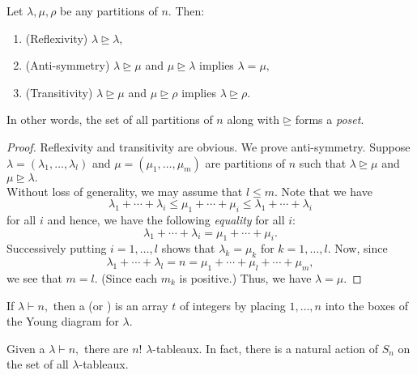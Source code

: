 \begin{prop}
	Let $\lambda, \mu, \rho$ be any partitions of $n.$ Then:
	\begin{enumerate}
		\item (Reflexivity) $\lambda \unrhd \lambda,$
		\item (Anti-symmetry) $\lambda \unrhd \mu$ and $\mu \unrhd \lambda$ implies $\lambda = \mu,$
		\item (Transitivity) $\lambda \unrhd \mu$ and $\mu \unrhd \rho$ implies $\lambda \unrhd \rho.$
	\end{enumerate}
	In other words, the set of all partitions of $n$ along with $\unrhd$ forms a \emph{poset}.
\end{prop}
\begin{proof} 
	Reflexivity and transitivity are obvious. We prove anti-symmetry. Suppose $\lambda = (\lambda_1, \ldots, \lambda_l)$ and $\mu = (\mu_1, \ldots, \mu_m)$ are partitions of $n$ such that $\lambda \unrhd \mu$ and $\mu \unrhd \lambda.$ \\
	Without loss of generality, we may assume that $l \le m.$ Note that we have
	\begin{equation*} 
		\lambda_1 + \cdots + \lambda_i \le \mu_1 + \cdots + \mu_i \le \lambda_1 + \cdots + \lambda_i
	\end{equation*}
	for all $i$ and hence, we have the following \emph{equality} for all $i:$
	\begin{equation*} 
		\lambda_1 + \cdots + \lambda_i = \mu_1 + \cdots + \mu_i.
	\end{equation*}
	Successively putting $i = 1, \ldots, l$ shows that $\lambda_k = \mu_k$ for $k = 1, \ldots, l.$ Now, since
	\begin{equation*} 
		\lambda_1 + \cdots + \lambda_l = n = \mu_1 + \cdots + \mu_l + \cdots + \mu_m,
	\end{equation*}
	we see that $m = l.$ (Since each $m_k$ is positive.) Thus, we have $\lambda = \mu.$
\end{proof}

\begin{defn}%
	\label{defn:youngtableau}
	If $\lambda \vdash n,$ then a \footnotemark (or ) is an array $t$ of integers by placing $1, \ldots, n$ into the boxes of the Young diagram for $\lambda.$
\end{defn}
Given a $\lambda \vdash n,$ there are $n!$ $\lambda$-tableaux. In fact, there is a natural action of $S_n$ on the set of all $\lambda$-tableaux.

